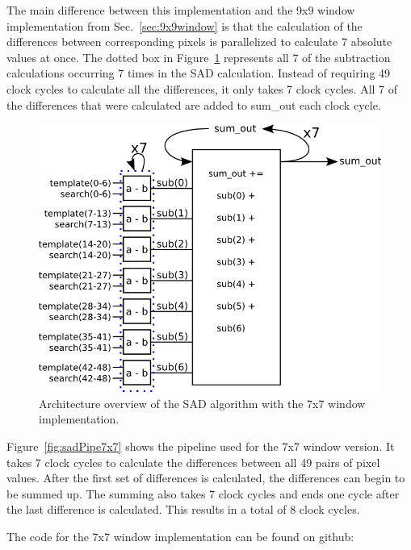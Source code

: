 The main difference between this implementation and the 9x9 window implementation from Sec.~\ref{sec:9x9window} is that the calculation of the differences between corresponding pixels is parallelized to calculate 7 absolute values at once. The dotted box in Figure~\ref{fig:sadAlg7x7} represents all 7 of the subtraction calculations occurring 7 times in the SAD calculation. Instead of requiring 49 clock cycles to calculate all the differences, it only takes 7 clock cycles. All 7 of the differences that were calculated are added to sum\_out each clock cycle.

\begin{figure}
	\begin{center}
		\includegraphics[width=130mm]{figures/sadAlgorithm7x7.png}
		\captionfonts
		\caption{Architecture overview of the SAD algorithm with the 7x7 window implementation.}
		\label{fig:sadAlg7x7}
	\end{center}
\end{figure}

Figure~\ref{fig:sadPipe7x7} shows the pipeline used for the 7x7 window version. It takes 7 clock cycles to calculate the differences between all 49 pairs of pixel values. After the first set of differences is calculated, the differences can begin to be summed up. The summing also takes 7 clock cycles and ends one cycle after the last difference is calculated. This results in a total of 8 clock cycles.

The code for the 7x7 window implementation can be found on github:
\\

